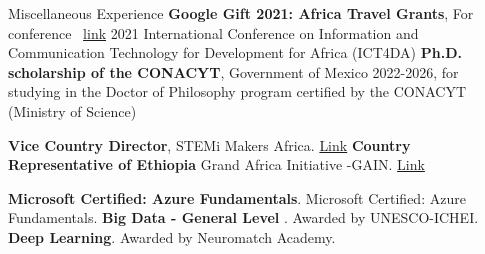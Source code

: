 \begin{rubric}{Miscellaneous Experience}
\entry*[2021] \textbf{Google Gift 2021: Africa Travel Grants}, For conference ~\href{https://www.ict4daconf.org//}{\color{OliveGreen}link} 2021 International Conference on Information and Communication Technology for Development for Africa (ICT4DA)
\entry*[2022] \textbf{Ph.D. scholarship of the CONACYT}, Government of Mexico 2022-2026, for studying in the Doctor of Philosophy program certified by the CONACYT (Ministry of Science)

%

\entry*[2020] \textbf{Vice Country Director}, STEMi Makers Africa. \href{https://stemiafrica.org/}{\color{OliveGreen}Link}
\entry*[2021] \textbf{Country Representative of Ethiopia}
Grand Africa Initiative -GAIN. 
\href{https://grandafrica.org/}{\color{OliveGreen}Link}


\entry*[2020] \textbf{Microsoft Certified: Azure Fundamentals}. Microsoft Certified: Azure Fundamentals.
\entry*[2020] \textbf{Big Data - General Level }. Awarded by UNESCO-ICHEI.
\entry*[2021] \textbf{Deep Learning}. Awarded by Neuromatch Academy. 

\end{rubric}